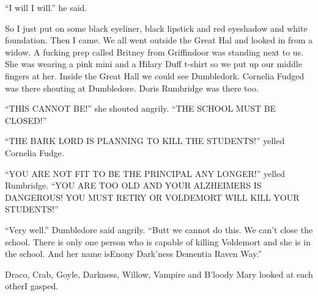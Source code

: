 \enquote{I will I will.} he said.

So I just put on some black eyeliner, black lipstick and red eyeshadow and white foundation. Then I came. We all went outside the Great Hal and looked in from a widow. A fucking prep called Britney from Griffindoor was standing next to us. She was wearing a pink mini and a Hilary Duff t-shirt so we put up our middle fingers at her. Inside the Great Hall we could see Dumbledork. Cornelia Fudged was there shouting at Dumbledore. Doris Rumbridge was there too.

\enquote{THIS CANNOT BE\@!} she shouted angrily. \enquote{THE SCHOOL MUST BE CLOSED\@!}

\begin{sloppypar}
    \enquote{THE BARK LORD IS PLANNING TO KILL THE STU\-DENTS\@!} yelled Cornelia Fudge.
\end{sloppypar}

\begin{sloppypar}
    \enquote{YOU ARE NOT FIT TO BE THE PRINCIPAL ANY LONGER\@!} yelled Rumbridge. \enquote{YOU ARE TOO OLD AND YOUR ALZ\-HEIMERS IS DANGEROUS\@! YOU MUST RETRY OR VOL\-DE\-MORT WILL KILL YOUR STUDENTS\@!}
\end{sloppypar}

\enquote{Very well.} Dumbledore said angrily. \enquote{Butt we cannot do this. We can't close the school. There is only one person who is capable of killing Voldemort and she is in the school. And her name is\dotfill\newline\phantom{}\dotfill Enony Dark'ness Dementia Raven Way.} 

Draco, Crab, Goyle, Darkness, Willow, Vampire and B'loody Mary looked at each other\dotfill I gasped.

